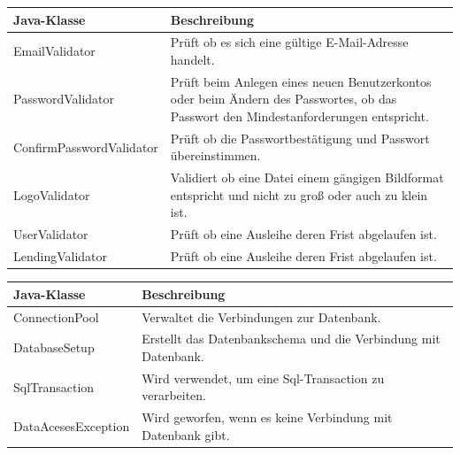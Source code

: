 \documentclass{article}
\begin{document}
  \begin{center}
    \begin{table}
        \begin{tabular} { |p{}|p{}| }
             \hline
            Java-Klasse & Beschreibung  \\
           \hline\hline
            EmailValidator & Prüft ob es sich eine gültige E-Mail-Adresse handelt. \\
            \hline
            PasswordValidator & Prüft beim Anlegen eines neuen Benutzerkontos oder beim Ändern des Passwortes, ob das Passwort den Mindestanforderungen entspricht. \\
             \hline
            ConfirmPasswordValidator & Prüft ob die Passwortbestätigung und Passwort übereinstimmen. \\
            \hline
           LogoValidator & Validiert ob eine Datei einem gängigen Bildformat entspricht und nicht zu groß oder auch zu klein ist. \\
             \hline
            UserValidator & Prüft ob eine Ausleihe deren Frist abgelaufen ist. \\
            \hline
            LendingValidator & Prüft ob eine Ausleihe deren Frist abgelaufen ist. \\
            \hline
        \end{tabular}
        \end{table}
        \end{center}


  \begin{center}
    \begin{table}
        \begin{tabular} { |p{}|p{}| }
              \hline
            Java-Klasse & Beschreibung  \\
           \hline\hline
            ConnectionPool & Verwaltet die Verbindungen zur Datenbank. \\
            \hline
            DatabaseSetup& Erstellt das Datenbankschema und die Verbindung mit Datenbank. \\
             \hline
            SqlTransaction& Wird verwendet, um eine Sql-Transaction zu verarbeiten. \\
             \hline
            DataAcesesException& Wird geworfen,  wenn es keine Verbindung mit Datenbank gibt. \\
           \hline
        \end{tabular}
        \end{table}
        \end{center}
\end{document}
